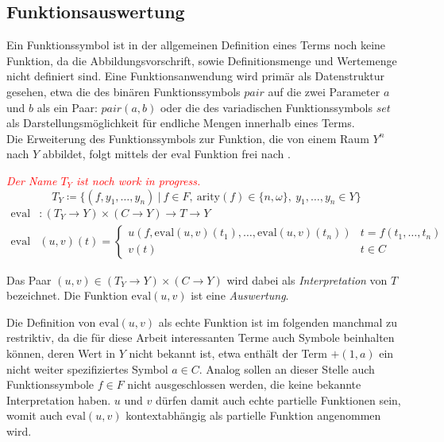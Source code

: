 \documentclass{scrartcl}
\begin{document}
\subsection{Funktionsauswertung}
Ein Funktionssymbol ist in der allgemeinen Definition eines Terms noch keine Funktion, da die Abbildungsvorschrift, sowie Definitionsmenge und Wertemenge nicht definiert sind. Eine Funktionsanwendung wird primär als Datenstruktur gesehen, etwa die des binären Funktionssymbols $pair$ auf die zwei Parameter $a$ und $b$ als ein Paar: $pair(a, b)$ oder die des variadischen Funktionssymbols $set$ als Darstellungsmöglichkeit für endliche Mengen innerhalb eines Terms.\\
Die Erweiterung des Funktionssymbols zur Funktion, die von einem Raum $Y^n$ nach $Y$ abbildet, folgt mittels der $\mathrm{eval}$ Funktion frei nach \cite{buch1977}.

\textcolor{red}{\textit{Der Name $T_Y$ ist noch work in progress.}}
$$T_Y \coloneqq \{(f, y_1, \dots, y_n)~|~f \in F,~\mathrm{arity}(f) \in \{n, \omega\},
~ y_1, \dots,y_n \in Y\}$$
\begin{equation*}
    \begin{split}
	\mathrm{eval} &\colon (T_Y \rightarrow Y) \times (C \rightarrow Y) \rightarrow T \rightarrow Y\\
	\mathrm{eval} &(u, v)(t) = \begin{cases}
		u(f, \mathrm{eval}(u, v)(t_1), \dots, \mathrm{eval}(u, v)(t_n)) & t = f(t_1, \dots, t_n)\\
		v(t)                                                                                            & t \in C
		\end{cases}
    \end{split}
\end{equation*}

Das Paar $(u, v) \in (T_Y \rightarrow Y) \times (C \rightarrow Y)$ wird dabei als \emph{Interpretation} von $T$ bezeichnet. Die Funktion $\mathrm{eval}(u, v)$ ist eine \emph{Auswertung}. 

Die Definition von $\mathrm{eval}(u, v)$ als echte Funktion ist im folgenden manchmal zu restriktiv, da die für diese Arbeit interessanten Terme auch Symbole beinhalten können, deren Wert in $Y$ nicht bekannt ist, etwa enthält der Term $+(1, a)$ ein nicht weiter spezifiziertes Symbol $a \in C$. Analog sollen an dieser Stelle auch Funktionssymbole $f \in F$ nicht ausgeschlossen werden, die keine bekannte Interpretation haben. $u$ und $v$ dürfen damit auch echte partielle Funktionen sein, womit auch $\mathrm{eval}(u, v)$ kontextabhängig als partielle Funktion angenommen wird.
\\~\\
\end{document}
